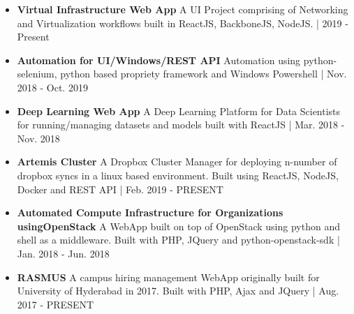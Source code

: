 \documentclass[10pt,a4paper,ragged2e]{altacv}
\begin{document}





\smallskip
\begin{itemize}
\item \textbf{Virtual Infrastructure Web App}
\newline
A UI Project comprising of Networking and Virtualization workflows built in ReactJS, BackboneJS, NodeJS. | 2019 - Present
\smallskip
\item \textbf{Automation for UI/Windows/REST API}
\newline
Automation using python-selenium, python based propriety framework and Windows Powershell | Nov. 2018 - Oct. 2019
\smallskip
\item \textbf{Deep Learning Web App}
\newline
A Deep Learning Platform for Data Scientists for running/managing datasets and models built with ReactJS | Mar. 2018 - Nov. 2018
\smallskip
\item \textbf{Artemis Cluster}
\newline
A Dropbox Cluster Manager for deploying n-number of dropbox syncs in a linux based environment. Built using ReactJS, NodeJS, Docker and REST API | Feb. 2019 - PRESENT
\smallskip
\item  \textbf{Automated Compute Infrastructure for Organizations using\newline OpenStack}
\newline
A WebApp built on top of OpenStack using python and shell as a middleware. Built with PHP, JQuery and python-openstack-sdk |  Jan. 2018 - Jun. 2018
\smallskip
\item \textbf{RASMUS}
\newline
A campus hiring management WebApp originally built for University of Hyderabad in 2017. Built with PHP, Ajax and JQuery |  Aug. 2017 - PRESENT
\end{itemize}


\end{document}
